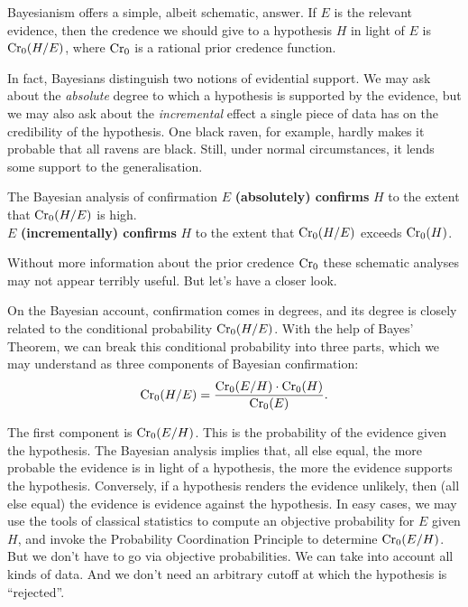 Bayesianism offers a simple, albeit schematic, answer. If $E$ is the relevant
evidence, then the credence we should give to a hypothesis $H$ in light of $E$
is $\text{Cr}_{0}(H/E)$, where $\text{Cr}_{0}$ is a rational prior credence function.

In fact, Bayesians distinguish two notions of evidential support. We may ask
about the \emph{absolute} degree to which a hypothesis is supported by the
evidence, but we may also ask about the \emph{incremental} effect a single piece of
data has on the credibility of the hypothesis. One black raven,
for example, hardly makes it probable that all ravens are black. Still, under
normal circumstances, it lends some support to the generalisation.

\begin{genericthm}{The Bayesian analysis of confirmation}
  $E$ \textbf{(absolutely) confirms} $H$ to the extent that $\text{Cr}_{0}(H/E)$ is high.\\
  $E$ \textbf{(incrementally) confirms} $H$ to the extent that $\text{Cr}_{0}(H/E)$ exceeds $\text{Cr}_{0}(H)$.
\end{genericthm}

Without more information about the prior credence $\text{Cr}_{0}$ these
schematic analyses may not appear terribly useful. But let's have a closer look.

On the Bayesian account, confirmation comes in degrees, and its degree is
closely related to the conditional probability $\text{Cr}_{0}(H/E)$. With the help of
Bayes' Theorem, we can break this conditional probability into three parts,
which we may understand as three components of Bayesian confirmation:
\[
   \text{Cr}_{0}(H/E) = \frac{\text{Cr}_{0}(E/H) \cdot \text{Cr}_{0}(H)}{\text{Cr}_{0}(E)}.
\]

The first component is $\text{Cr}_{0}(E/H)$. This is the probability of the evidence
given the hypothesis. The Bayesian analysis implies that, all else equal, the
more probable the evidence is in light of a hypothesis, the more the evidence
supports the hypothesis. Conversely, if a hypothesis renders the evidence
unlikely, then (all else equal) the evidence is evidence against the hypothesis.
In easy cases, we may use the tools of classical statistics to compute an
objective probability for $E$ given $H$, and invoke the Probability Coordination
Principle to determine $\text{Cr}_{0}(E/H)$. But we don't have to go via objective
probabilities. We can take into account all kinds of data. And we don't need an
arbitrary cutoff at which the hypothesis is ``rejected''. 

